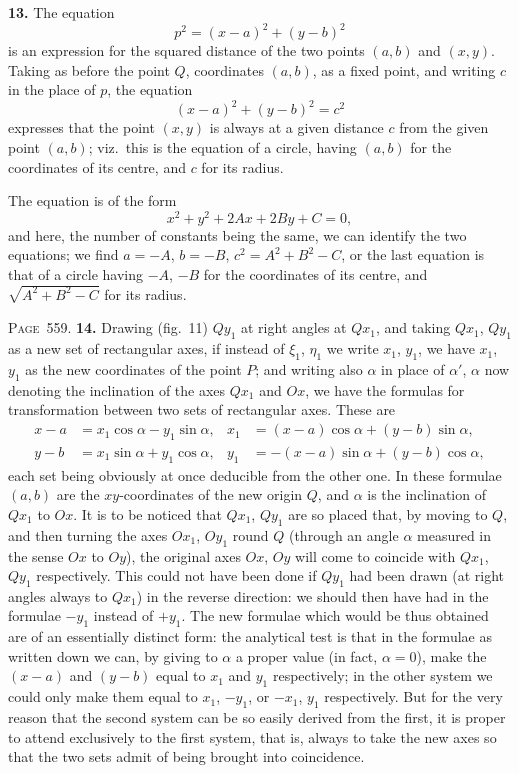 \documentclass[11pt,a4paper]{book}
\begin{document}
\textbf{13.} The equation
\[
p^2 = (x-a)^2+(y-b)^2
\]
is an expression for the squared distance of the two points $(a,b)$ and $(x,y)$. Taking as before the point $Q$, coordinates $(a,b)$, as a fixed point, and writing $c$ in the place of $p$, the equation
\[
(x-a)^2+(y-b)^2=c^2
\]
expresses that the point $(x,y)$ is always at a given distance $c$ from the given point $(a,b)$; viz.\ this is the equation of a circle, having $(a,b)$ for the coordinates of its centre, and $c$ for its radius.

The equation is of the form
\[
x^2+y^2+2Ax+2By+C=0,
\]
and here, the number of constants being the same, we can identify the two equations; we find $a=-A$, $b=-B$, $c^2=A^2+B^2-C$, or the last equation is that of a circle having $-A$, $-B$ for the coordinates of its centre, and $\sqrt{A^2+B^2-C}$ for its radius.

\newpage
\noindent\textsc{Page~559.} \textbf{14.} Drawing (fig.~11) $Qy_1$ at right angles at $Qx_1$, and taking $Qx_1$, $Qy_1$ as a new set of rectangular axes, if instead of $\xi_1$, $\eta_1$ we write $x_1$, $y_1$, we have $x_1$, $y_1$ as the new coordinates of the point $P$; and writing also $\alpha$ in place of $\alpha'$, $\alpha$ now denoting the inclination of the axes $Qx_1$ and $Ox$, we have the formulas for transformation between two sets of rectangular axes. These are
\begin{align*}
x-a &= x_1\cos\alpha - y_1\sin\alpha, & x_1 &= (x-a)\cos\alpha + (y-b)\sin\alpha,\\
y-b &= x_1\sin\alpha + y_1\cos\alpha, & y_1 &= -(x-a)\sin\alpha + (y-b)\cos\alpha,
\end{align*}
each set being obviously at once deducible from the other one. In these formulae $(a,b)$ are the $xy$-coordinates of the new origin $Q$, and $\alpha$ is the inclination of $Qx_1$ to $Ox$. It is to be noticed that $Qx_1$, $Qy_1$ are so placed that, by moving to $Q$, and then turning the axes $Ox_1$, $Oy_1$ round $Q$ (through an angle $\alpha$ measured in the sense $Ox$ to $Oy$), the original axes $Ox$, $Oy$ will come to coincide with $Qx_1$, $Qy_1$ respectively. This could not have been done if $Qy_1$ had been drawn (at right angles always to $Qx_1$) in the reverse direction: we should then have had in the formulae $-y_1$ instead of $+y_1$. The new formulae which would be thus obtained are of an essentially distinct form: the analytical test is that in the formulae as written down we can, by giving to $\alpha$ a proper value (in fact, $\alpha=0$), make the $(x-a)$ and $(y-b)$ equal to $x_1$ and $y_1$ respectively; in the other system we could only make them equal to $x_1$, $-y_1$, or $-x_1$, $y_1$ respectively. But for the very reason that the second system can be so easily derived from the first, it is proper to attend exclusively to the first system, that is, always to take the new axes so that the two sets admit of being brought into coincidence.
\end{document}
